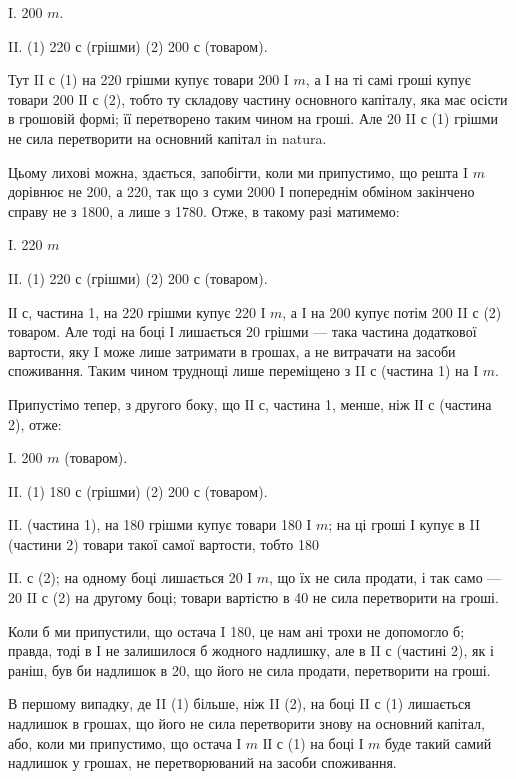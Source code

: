 
I.    200 $m$.

II. (1) 220 $с$ (грішми) \dplus{} (2) 200 $с$ (товаром).

Тут II $с$ (1) на 220 грішми купує товари 200 I $m$, а І на
ті самі гроші купує товари 200 ІІ $с$ (2), тобто ту складову частину
основного капіталу, яка має осісти в грошовій формі; її перетворено
таким чином на гроші. Але 20 II $с$ (1) грішми не сила перетворити на
основний капітал in natura.

Цьому лихові можна, здається, запобігти, коли ми припустимо, що решта
I $m$ дорівнює не 200, а 220, так що з суми 2000 І попереднім обміном закінчено
справу не з 1800, а лише з 1780. Отже, в такому разі матимемо:

I.    220 $m$

II. (1) 220 $с$ (грішми) \dplus{} (2) 200 $с$ (товаром).

ІІ $с$, частина 1, на 220 грішми купує 220 І $m$, а І на
200 купує потім 200 II $с$ (2) товаром. Але тоді на боці І
лишається 20 грішми — така частина додаткової вартости, яку
I може лише затримати в грошах, а не витрачати на засоби споживання.
Таким чином труднощі лише переміщено з II $с$ (частина 1) на І $m$.

Припустімо тепер, з другого боку, що ІІ $с$, частина 1, менше, ніж ІІ $с$
(частина 2), отже:


I.    200 $m$ (товаром).

II. (1) 180 $с$ (грішми) \dplus{} (2) 200 $с$ (товаром).

II. (частина 1), на 180 грішми купує товари 180 І $m$; на ці
гроші І купує в II (частини 2) товари такої самої вартости, тобто 180

II.    $с$ (2); на одному боці лишається 20 І $m$, що їх не сила продати, і так
само — 20 II $с$ (2) на другому боці; товари вартістю в 40 не сила перетворити
на гроші.

Коли б ми припустили, що остача I \deq{} 180, це нам ані трохи не допомогло
б; правда, тоді в І не залишилося б жодного надлишку, але в II $с$
(частині 2), як і раніш, був би надлишок в 20, що його не сила продати,
перетворити на гроші.

В першому випадку, де II (1) більше, ніж II (2), на боці II $с$ (1)
лишається надлишок в грошах, що його не сила перетворити знову на
основний капітал, або, коли ми припустимо, що остача І $m$ \deq{} ІІ $с$ (1) на
боці І $m$ буде такий самий надлишок у грошах, не перетворюваний на
засоби споживання.

